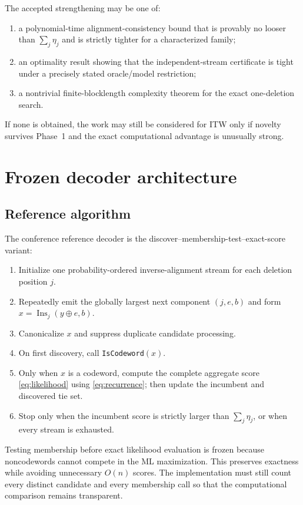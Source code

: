 \documentclass[11pt]{article}
\theoremstyle{definition}
\theoremstyle{remark}
\newcommand{\Ins}{\operatorname{Ins}}
\begin{document}
The accepted strengthening may be one of:
\begin{enumerate}
  \item a polynomial-time alignment-consistency bound that is provably no looser than $\sum_j\eta_j$ and is strictly tighter for a characterized family;
  \item an optimality result showing that the independent-stream certificate is tight under a precisely stated oracle/model restriction;
  \item a nontrivial finite-blocklength complexity theorem for the exact one-deletion search.
\end{enumerate}

If none is obtained, the work may still be considered for ITW only if novelty survives Phase~1 and the exact computational advantage is unusually strong.

\section{Frozen decoder architecture}

\subsection{Reference algorithm}
\label{sec:refalg}

The conference reference decoder is the discover--membership-test--exact-score variant:

\begin{enumerate}
  \item Initialize one probability-ordered inverse-alignment stream for each deletion position $j$.
  \item Repeatedly emit the globally largest next component $(j,e,b)$ and form $x=\Ins_j(y\oplus e,b)$.
  \item Canonicalize $x$ and suppress duplicate candidate processing.
  \item On first discovery, call \texttt{IsCodeword}$(x)$.
  \item Only when $x$ is a codeword, compute the complete aggregate score \cref{eq:likelihood} using \cref{eq:recurrence}; then update the incumbent and discovered tie set.
  \item Stop only when the incumbent score is strictly larger than $\sum_j\eta_j$, or when every stream is exhausted.
\end{enumerate}

Testing membership before exact likelihood evaluation is frozen because noncodewords cannot compete in the ML maximization. This preserves exactness while avoiding unnecessary $O(n)$ scores. The implementation must still count every distinct candidate and every membership call so that the computational comparison remains transparent.
\end{document}
